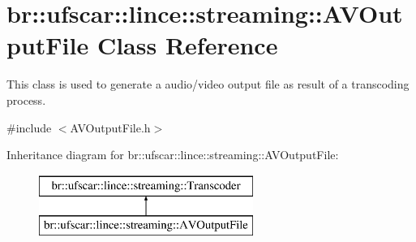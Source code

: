\hypertarget{classbr_1_1ufscar_1_1lince_1_1streaming_1_1AVOutputFile}{
\section{br::ufscar::lince::streaming::AVOutputFile Class Reference}
\label{classbr_1_1ufscar_1_1lince_1_1streaming_1_1AVOutputFile}
}


This class is used to generate a audio/video output file as result of a transcoding process.  




{\ttfamily \#include $<$AVOutputFile.h$>$}

Inheritance diagram for br::ufscar::lince::streaming::AVOutputFile:\begin{figure}[H]
\begin{center}
\leavevmode
\includegraphics[height=2cm]{classbr_1_1ufscar_1_1lince_1_1streaming_1_1AVOutputFile}
\end{center}
\end{figure}

